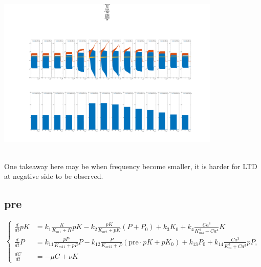 \documentclass{article}
\begin{document}
\begin{minipage}{\textwidth} %
    \centering
    \includegraphics[width=0.8\textwidth]{pairs=60_hertz=0.60.png} %
    \label{fig:a0.25}
\end{minipage}\\
One takeaway here may be when frequency become smaller, it is harder for LTD at negative side to be observed.
\subsection{pre}
\begin{equation}
\left\{
    \begin{aligned}
        \frac{d}{dt}pK &= k_1 \frac{K}{K_{m1} + K}pK - k_2 \frac{pK}{K_{m2} + pK}(P + P_0) + k_3K_0 + k_4 \frac{Ca^4}{K_{m4}^4 + Ca^4} K\\
        \frac{d}{dt}P &= k_{11} \frac{pP}{K_{m11} + pP}P - k_{12} \frac{P}{K_{m12} + P}(\text{pre}\cdot pK + pK_0) + k_{13}P_0 + k_{14} \frac{Ca^3}{K_{m}^3 + Ca^3}pP,\\
        \frac{dC}{dt} &=-\mu C+\nu K
    \end{aligned}
\right.
\end{equation}


\newpage
\end{document}
